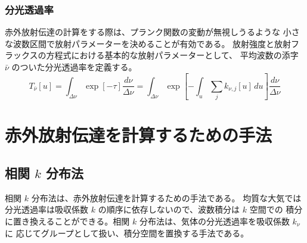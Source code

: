 \documentclass[book]{dennou777}
\begin{document}
\subsection{分光透過率}
赤外放射伝達の計算をする際は、プランク関数の変動が無視しうるような
小さな波数区間で放射パラメーターを決めることが有効である。
放射強度と放射フラックスの方程式における基本的な放射パラメーターとして、
平均波数の添字 \(\bar\nu\) のついた分光透過率を定義する。
\begin{equation}
	T_{\bar\nu}[u]
	=\int_{\Delta\nu}\exp[-\tau]\frac{d\nu}{\Delta\nu}
	=\int_{\Delta\nu}\exp\left[-\int_u\sum_j k_{\nu,j}[u]\,du\right]\frac{d\nu}{\Delta\nu}
\end{equation}

\chapter{赤外放射伝達を計算するための手法}

\section{相関 \(k\) 分布法}
相関 \(k\) 分布法は、赤外放射伝達を計算するための手法である。
均質な大気では分光透過率は吸収係数 \(k\) の順序に依存しないので、波数積分は \(k\) 空間での
積分に置き換えることができる。相関 \(k\) 分布法は、気体の分光透過率を吸収係数 \(k_\nu\) に
応じてグループとして扱い、積分空間を置換する手法である。
\end{document}

